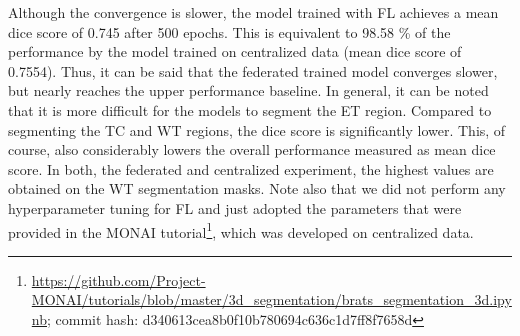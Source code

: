 Although the convergence is slower, the model trained with FL achieves a mean dice score of 0.745 after 500 epochs. This is equivalent to 98.58 \% of the performance by the model trained on centralized data (mean dice score of 0.7554). Thus, it can be said that the federated trained model converges slower, but nearly reaches the upper performance baseline.
In general, it can be noted that it is more difficult for the models to segment the ET region. Compared to segmenting the TC and WT regions, the dice score is significantly lower. This, of course, also considerably lowers the overall performance measured as mean dice score.
In both, the federated and centralized experiment, the highest values are obtained on the WT segmentation masks.
Note also that we did not perform any hyperparameter tuning for FL and just adopted the parameters that were provided in the MONAI tutorial\footnote{\url{https://github.com/Project-MONAI/tutorials/blob/master/3d\_segmentation/brats\_segmentation\_3d.ipynb}; commit hash: d340613cea8b0f10b780694c636c1d7ff8f7658d}, which was developed on centralized data.

